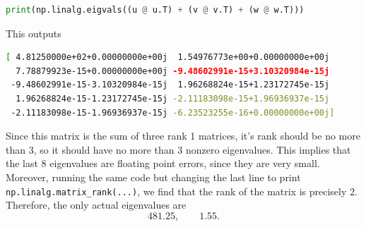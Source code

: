 \documentclass[11pt, letterpaper]{article}
\begin{document}
\begin{enumerate}
\begin{lstlisting}[language=Python]
print(np.linalg.eigvals((u @ u.T) + (v @ v.T) + (w @ w.T)))
	\end{lstlisting}
	This outputs
	\begin{lstlisting}[language=Bash]
		[ 4.81250000e+02+0.00000000e+00j  1.54976773e+00+0.00000000e+00j
  7.78879923e-15+0.00000000e+00j -9.48602991e-15+3.10320984e-15j
 -9.48602991e-15-3.10320984e-15j  1.96268824e-15+1.23172745e-15j
  1.96268824e-15-1.23172745e-15j -2.11183098e-15+1.96936937e-15j
 -2.11183098e-15-1.96936937e-15j -6.23523255e-16+0.00000000e+00j]
	\end{lstlisting}
	Since this matrix is the sum of three rank 1 matrices, it's rank should be no more than 3, so it should have no more than 3 nonzero eigenvalues. This implies that the last 8 eigenvalues are floating point errors, since they are very small. Moreover, running the same code but changing the last line to print \verb|np.linalg.matrix_rank(...)|, we find that the rank of the matrix is precisely 2. Therefore, the only actual eigenvalues are
	\[
		481.25,\qquad 1.55
	.\]
\end{enumerate}
\end{document}
